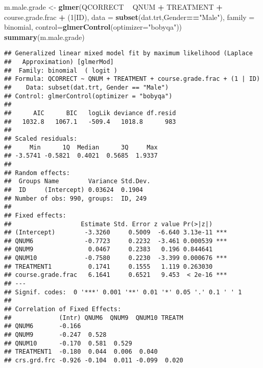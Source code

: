 \documentclass[]{article}
\newenvironment{Shaded}{\begin{snugshade}}{\end{snugshade}}
\newcommand{\KeywordTok}[1]{\textcolor[rgb]{0.13,0.29,0.53}{\textbf{#1}}}
\newcommand{\DataTypeTok}[1]{\textcolor[rgb]{0.13,0.29,0.53}{#1}}
\newcommand{\DecValTok}[1]{\textcolor[rgb]{0.00,0.00,0.81}{#1}}
\newcommand{\StringTok}[1]{\textcolor[rgb]{0.31,0.60,0.02}{#1}}
\newcommand{\OperatorTok}[1]{\textcolor[rgb]{0.81,0.36,0.00}{\textbf{#1}}}
\newcommand{\NormalTok}[1]{#1}
\begin{document}
\begin{Shaded}
\begin{Highlighting}[]
\NormalTok{m.male.grade <-}\StringTok{ }\KeywordTok{glmer}\NormalTok{(QCORRECT }\OperatorTok{~}\StringTok{ }\NormalTok{QNUM }\OperatorTok{+}\StringTok{ }\NormalTok{TREATMENT }\OperatorTok{+}\StringTok{ }\NormalTok{course.grade.frac }\OperatorTok{+}\StringTok{ }\NormalTok{(}\DecValTok{1}\OperatorTok{|}\NormalTok{ID), }
                \DataTypeTok{data =} \KeywordTok{subset}\NormalTok{(dat.trt,Gender}\OperatorTok{==}\StringTok{"Male"}\NormalTok{), }
                \DataTypeTok{family =}\NormalTok{ binomial, }\DataTypeTok{control=}\KeywordTok{glmerControl}\NormalTok{(}\DataTypeTok{optimizer=}\StringTok{"bobyqa"}\NormalTok{))}
\KeywordTok{summary}\NormalTok{(m.male.grade)}
\end{Highlighting}
\end{Shaded}

\begin{verbatim}
## Generalized linear mixed model fit by maximum likelihood (Laplace
##   Approximation) [glmerMod]
##  Family: binomial  ( logit )
## Formula: QCORRECT ~ QNUM + TREATMENT + course.grade.frac + (1 | ID)
##    Data: subset(dat.trt, Gender == "Male")
## Control: glmerControl(optimizer = "bobyqa")
## 
##      AIC      BIC   logLik deviance df.resid 
##   1032.8   1067.1   -509.4   1018.8      983 
## 
## Scaled residuals: 
##     Min      1Q  Median      3Q     Max 
## -3.5741 -0.5821  0.4021  0.5685  1.9337 
## 
## Random effects:
##  Groups Name        Variance Std.Dev.
##  ID     (Intercept) 0.03624  0.1904  
## Number of obs: 990, groups:  ID, 249
## 
## Fixed effects:
##                   Estimate Std. Error z value Pr(>|z|)    
## (Intercept)        -3.3260     0.5009  -6.640 3.13e-11 ***
## QNUM6              -0.7723     0.2232  -3.461 0.000539 ***
## QNUM9               0.0467     0.2383   0.196 0.844641    
## QNUM10             -0.7580     0.2230  -3.399 0.000676 ***
## TREATMENT1          0.1741     0.1555   1.119 0.263030    
## course.grade.frac   6.1641     0.6521   9.453  < 2e-16 ***
## ---
## Signif. codes:  0 '***' 0.001 '**' 0.01 '*' 0.05 '.' 0.1 ' ' 1
## 
## Correlation of Fixed Effects:
##             (Intr) QNUM6  QNUM9  QNUM10 TREATM
## QNUM6       -0.166                            
## QNUM9       -0.247  0.528                     
## QNUM10      -0.170  0.581  0.529              
## TREATMENT1  -0.180  0.044  0.006  0.040       
## crs.grd.frc -0.926 -0.104  0.011 -0.099  0.020
\end{verbatim}
\end{document}
